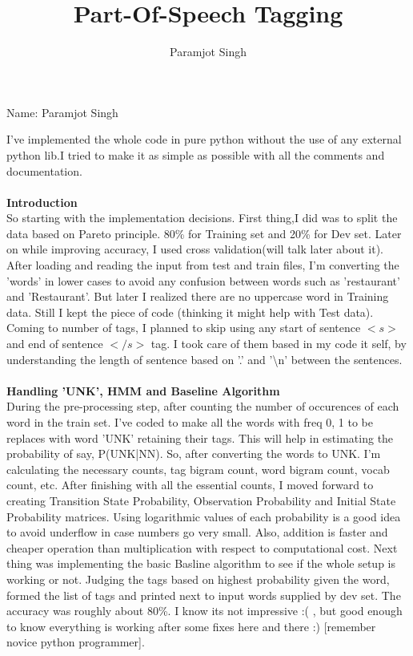 \documentclass[addpoints,12pt]{exam}
\title{Part-Of-Speech Tagging}
\author{Paramjot Singh}
\begin{document}
\maketitle

\pagestyle{headandfoot}
\runningheadrule
{}
              {}
              {Name: Paramjot Singh}
              \firstpagefooter{}{}{}
              \runningfooter{}{}{}

I've implemented the whole code in pure python without the use of any external python lib.I tried to make it as simple as possible with all the comments and documentation.\\
\\
\textbf{Introduction}\\
So starting with the implementation decisions. First thing,I did was to split the data based on Pareto principle. 80\% for Training set and 20\% for Dev set. Later on while improving accuracy, I used cross validation(will talk later about it).
After loading and reading the input from test and train files, I'm converting the 'words' in lower cases to avoid any confusion between words such as 'restaurant' and 'Restaurant'. But later I realized there are no uppercase word in Training data. Still I kept the piece of code (thinking it might help with Test data). Coming to number of tags, I planned to skip using any start of sentence $<s>$ and end of sentence $</s>$ tag. I took care of them based in my code it self, by understanding the length of sentence based on '.' and '\textbackslash n' between the sentences. 
\\ \\
\textbf{Handling 'UNK', HMM and Baseline Algorithm}\\
During the pre-processing step, after counting the number of occurences of each word in the train set. I've coded to make all the words with freq 0, 1 to be replaces with word 'UNK' retaining their tags. This will help in estimating the probability of say, P(UNK|NN). So, after converting the words to UNK. I'm calculating the necessary counts, tag bigram count, word bigram count, vocab count, etc.
After finishing with all the essential counts, I moved forward to creating Transition State Probability, Observation Probability and Initial State Probability matrices. Using logarithmic values of each probability is a good idea to avoid underflow in case numbers go very small. Also, addition is faster and cheaper operation than multiplication with respect to computational cost. Next thing was implementing the basic Basline algorithm to see if the whole setup is working or not. Judging the tags based on highest probability given the word, formed the list of tags and printed next to input words supplied by dev set. The accuracy was roughly about 80\%. I know its not impressive :( , but good enough to know everything is working after some fixes here and there :) [remember novice python programmer].\\ \\
\end{document}
